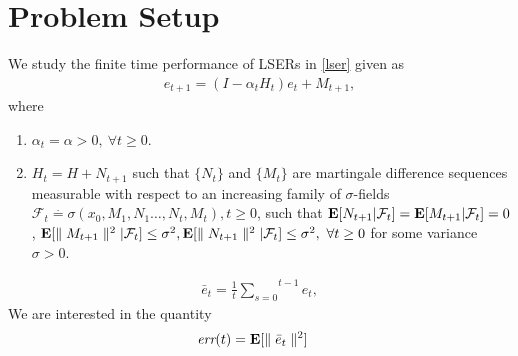 \section{Problem Setup}
We study the finite time performance of LSERs in \eqref{lser} given as
\begin{align}\label{lser}
e_{t+1}=(I-\alpha_t H_t)e_t+ M_{t+1},
\end{align}
where
\begin{assumption}\label{fpassump}
\begin{enumerate}[leftmargin=*]
\item $\alpha_t=\alpha>0,~\forall t\geq 0$.
\item $H_t=H+N_{t+1}$ such that $\{N_t\}$ and $\{M_t\}$ are martingale difference sequences measurable with respect to an increasing family of $\sigma$-fields $\mathcal{F}_{t}\stackrel{\cdot}{=}\sigma(x_0,M_1,N_1\ldots,N_t,M_t),t\geq 0$, such that $\mathbf{E}[N_{t+1}|\mathcal{F}_t]=\mathbf{E}[M_{t+1}|\mathcal{F}_t]=0$, $\mathbf{E}[\parallel M_{t+1} \parallel^2|\mathcal{F}_t]\leq \sigma^2, \mathbf{E}[\parallel N_{t+1} \parallel^2|\mathcal{F}_t]\leq \sigma^2, ~\forall t\geq 0$ for some variance $\sigma>0$.
\end{enumerate}
\end{assumption}
\begin{align}\label{erp}
\bar{e}_{t}=\frac{1}{t}\overset{t-1}{\underset{s=0}{\sum}}e_t,
\end{align}
We are interested in the quantity
\begin{align}\label{errfun}
\emph{err}(t)&= \mathbf{E}[\parallel \bar{e}_t\parallel^2]
\end{align}
